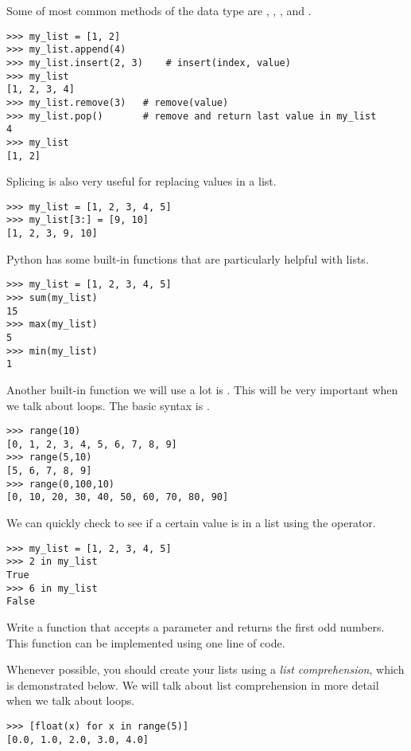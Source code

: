 Some of most common methods of the  data type are , , , and .
\begin{lstlisting}
>>> my_list = [1, 2]
>>> my_list.append(4)
>>> my_list.insert(2, 3)	# insert(index, value)
>>> my_list
[1, 2, 3, 4]
>>> my_list.remove(3)	# remove(value)
>>> my_list.pop()		# remove and return last value in my_list
4
>>> my_list
[1, 2]
\end{lstlisting}

Splicing is also very useful for replacing values in a list.
\begin{lstlisting}
>>> my_list = [1, 2, 3, 4, 5]
>>> my_list[3:] = [9, 10]
[1, 2, 3, 9, 10]
\end{lstlisting}

Python has some built-in functions that are particularly helpful with lists.
\begin{lstlisting}
>>> my_list = [1, 2, 3, 4, 5]
>>> sum(my_list)
15
>>> max(my_list)
5
>>> min(my_list)
1
\end{lstlisting}

Another built-in function we will use a lot is .  This will be very important when we talk about  loops.  The basic syntax is .
\begin{lstlisting}
>>> range(10)
[0, 1, 2, 3, 4, 5, 6, 7, 8, 9]
>>> range(5,10)
[5, 6, 7, 8, 9]
>>> range(0,100,10)
[0, 10, 20, 30, 40, 50, 60, 70, 80, 90]
\end{lstlisting}

We can quickly check to see if a certain value is in a list using the  operator.
\begin{lstlisting}
>>> my_list = [1, 2, 3, 4, 5]
>>> 2 in my_list
True
>>> 6 in my_list
False
\end{lstlisting}

\begin{problem}
Write a function  that accepts a parameter  and returns the first  odd numbers.  This function can be implemented using one line of code.
\end{problem}

Whenever possible, you should create your lists using a \emph{list comprehension}, which is demonstrated below.  We will talk about list comprehension in more detail when we talk about  loops.
\begin{lstlisting}
>>> [float(x) for x in range(5)]
[0.0, 1.0, 2.0, 3.0, 4.0]
\end{lstlisting}

